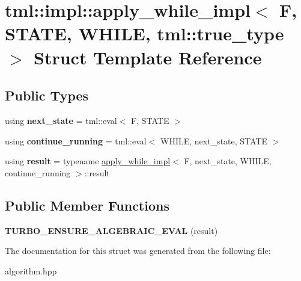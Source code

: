 \hypertarget{structtml_1_1impl_1_1apply__while__impl_3_01F_00_01STATE_00_01WHILE_00_01tml_1_1true__type_01_4}{\section{tml\+:\+:impl\+:\+:apply\+\_\+while\+\_\+impl$<$ F, S\+T\+A\+T\+E, W\+H\+I\+L\+E, tml\+:\+:true\+\_\+type $>$ Struct Template Reference}
\label{structtml_1_1impl_1_1apply__while__impl_3_01F_00_01STATE_00_01WHILE_00_01tml_1_1true__type_01_4}
}
\subsection*{Public Types}
\begin{DoxyCompactItemize}
\item 
\hypertarget{structtml_1_1impl_1_1apply__while__impl_3_01F_00_01STATE_00_01WHILE_00_01tml_1_1true__type_01_4_a581c4e6e55962372f5babc17e337b174}{using {\bfseries next\+\_\+state} = tml\+::eval$<$ F, S\+T\+A\+T\+E $>$}\label{structtml_1_1impl_1_1apply__while__impl_3_01F_00_01STATE_00_01WHILE_00_01tml_1_1true__type_01_4_a581c4e6e55962372f5babc17e337b174}

\item 
\hypertarget{structtml_1_1impl_1_1apply__while__impl_3_01F_00_01STATE_00_01WHILE_00_01tml_1_1true__type_01_4_acfc1b3fde20059425a07595155496ed2}{using {\bfseries continue\+\_\+running} = tml\+::eval$<$ W\+H\+I\+L\+E, next\+\_\+state, S\+T\+A\+T\+E $>$}\label{structtml_1_1impl_1_1apply__while__impl_3_01F_00_01STATE_00_01WHILE_00_01tml_1_1true__type_01_4_acfc1b3fde20059425a07595155496ed2}

\item 
\hypertarget{structtml_1_1impl_1_1apply__while__impl_3_01F_00_01STATE_00_01WHILE_00_01tml_1_1true__type_01_4_a08bbcb9ef90fa7444378deb233140e1f}{using {\bfseries result} = typename \hyperlink{structtml_1_1impl_1_1apply__while__impl}{apply\+\_\+while\+\_\+impl}$<$ F, next\+\_\+state, W\+H\+I\+L\+E, continue\+\_\+running $>$\+::result}\label{structtml_1_1impl_1_1apply__while__impl_3_01F_00_01STATE_00_01WHILE_00_01tml_1_1true__type_01_4_a08bbcb9ef90fa7444378deb233140e1f}

\end{DoxyCompactItemize}
\subsection*{Public Member Functions}
\begin{DoxyCompactItemize}
\item 
\hypertarget{structtml_1_1impl_1_1apply__while__impl_3_01F_00_01STATE_00_01WHILE_00_01tml_1_1true__type_01_4_a424e1f99f13393f85ff374226dc7ef89}{{\bfseries T\+U\+R\+B\+O\+\_\+\+E\+N\+S\+U\+R\+E\+\_\+\+A\+L\+G\+E\+B\+R\+A\+I\+C\+\_\+\+E\+V\+A\+L} (result)}\label{structtml_1_1impl_1_1apply__while__impl_3_01F_00_01STATE_00_01WHILE_00_01tml_1_1true__type_01_4_a424e1f99f13393f85ff374226dc7ef89}

\end{DoxyCompactItemize}


The documentation for this struct was generated from the following file\+:\begin{DoxyCompactItemize}
\item 
algorithm.\+hpp\end{DoxyCompactItemize}
